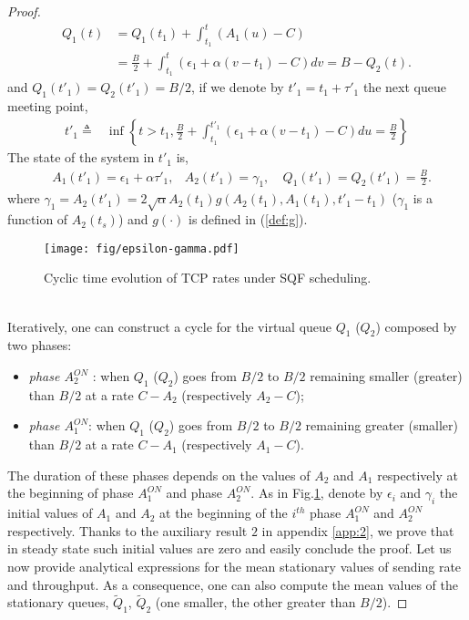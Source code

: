 \documentclass[a4paper,oneside, 11pt]{article}
\begin{document}
\begin{proof}
\begin{align*}
Q_1(t)&= Q_1(t_1)+\int_{t_1}^{t} (A_1(u)-C) \\
&=\frac{B}{2}+\int_{t_1}^{t} (\epsilon_1 +\alpha (v-t_1)-C) dv=B- Q_2(t). \nonumber
\end{align*}
and $Q_1(t'_1)=Q_2(t'_1)=B/2$, if we denote by $t'_1=t_1+\tau'_1$ the next queue meeting point,
\begin{align}\label{def:t1primo}
t'_1\triangleq &\inf\left\{t>t_1, \frac{B}{2}+\int_{t_1}^{t'_1} \left( \epsilon_1+\alpha(v-t_1)-C \right) du=\frac{B}{2} \right \} \end{align}
The state of the system in $t'_1$ is,
\begin{align*}&A_1(t'_1)=\epsilon_1+\alpha \tau'_1,&A_2(t'_1)= \gamma_1, &~ Q_1(t'_1)=Q_2(t'_1)=\frac{B}{2}.
\end{align*}
where $\gamma_1=A_2(t'_1)=2\sqrt{\alpha}A_2(t_1)g(A_2(t_1),A_1(t_1),t'_1-t_1)$ ($\gamma_1$ is a function of $A_2(t_s)$) and
$g(\cdot)$ is defined in (\ref{def:g}).
\begin{figure}[htb]
\begin{center}
\texttt{[image: fig/epsilon-gamma.pdf]}
\end{center}
\caption{Cyclic time evolution of TCP rates under SQF scheduling.}
 \label{fig:rates-cycle}
\end{figure}
\\Iteratively, one can construct a cycle for the virtual queue $Q_1$ ($Q_2$)  composed by two phases:
\begin{itemize}
 \item \textit{phase $A_2^{ON}$ }: when $Q_1$ ($Q_2$) goes from $B/2$ to $B/2$ remaining smaller (greater) than $B/2$ at a rate $C-A_2$ (respectively $A_2-C$);
 \item \textit{phase $A_1^{ON}$}:  when $Q_1$ ($Q_2$) goes from $B/2$ to $B/2$ remaining greater (smaller) than $B/2$ at a rate $C-A_1$ (respectively $A_1-C$).
\end{itemize}
The duration of these phases depends on the values of $A_2$ and $A_1$ respectively at the beginning of phase $A_1^{ON}$ and phase $A_2^{ON}$.
As in Fig.\ref{fig:rates-cycle}, denote by $\epsilon_i$ and $\gamma_i$ the initial values of $A_1$ and $A_2$ at the beginning of the $i^{th}$ phase $A_1^{ON}$ and $A_2^{ON}$ respectively.
Thanks to the auxiliary result $2$ in appendix \ref{app:2}, we prove that in steady state such initial values are zero and easily conclude the proof.
Let us now provide analytical expressions for the mean stationary values of sending rate and throughput. As a consequence, one can also compute the mean values of the stationary queues,
$\widetilde{Q}_1$, $\widetilde{Q}_2$ (one smaller, the other greater than $B/2$).
\end{proof}
\end{document}
